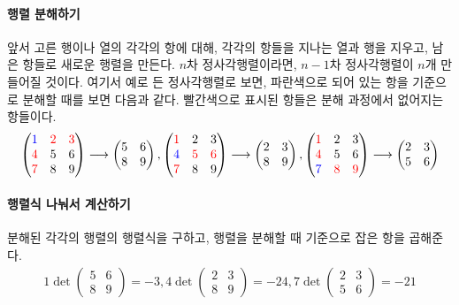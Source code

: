 \paragraph{행렬 분해하기} 앞서 고른 행이나 열의 각각의 항에 대해, 각각의 항들을 지나는 열과 행을 지우고, 남은 항들로 새로운 행렬을 만든다. $n$차 정사각행렬이라면, $n-1$차 정사각행렬이 $n$개 만들어질 것이다. 여기서 예로 든 정사각행렬로 보면, 파란색으로 되어 있는 항을 기준으로 분해할 때를 보면 다음과 같다. 빨간색으로 표시된 항들은 분해 과정에서 없어지는 항들이다.
\begin{align*}
\begin{pmatrix}
\color{blue}1 & \color{red}2 & \color{red}3\\
\color{red}4 & 5 & 6\\
\color{red}7 & 8 & 9
\end{pmatrix}\longrightarrow\begin{pmatrix}
5 & 6\\
8 & 9
\end{pmatrix},
\begin{pmatrix}
\color{red}1 & 2 & 3\\
\color{blue}4 & \color{red}5 & \color{red}6\\
\color{red}7 & 8 & 9
\end{pmatrix}\longrightarrow\begin{pmatrix}
2 & 3\\
8 & 9
\end{pmatrix},
\begin{pmatrix}
\color{red}1 & 2 & 3\\
\color{red}4 & 5 & 6\\
\color{blue}7 & \color{red}8 & \color{red}9
\end{pmatrix}\longrightarrow\begin{pmatrix}
2 & 3\\
5 & 6
\end{pmatrix}
\end{align*}
\paragraph{행렬식 나눠서 계산하기} 분해된 각각의 행렬의 행렬식을 구하고, 행렬을 분해할 때 기준으로 잡은 항을 곱해준다.
\begin{align*}
1\det\begin{pmatrix}
5 & 6\\
8 & 9
\end{pmatrix}=-3,
4\det\begin{pmatrix}
2 & 3\\
8 & 9
\end{pmatrix}=-24,
7\det\begin{pmatrix}
2 & 3\\
5 & 6
\end{pmatrix}=-21
\end{align*}
